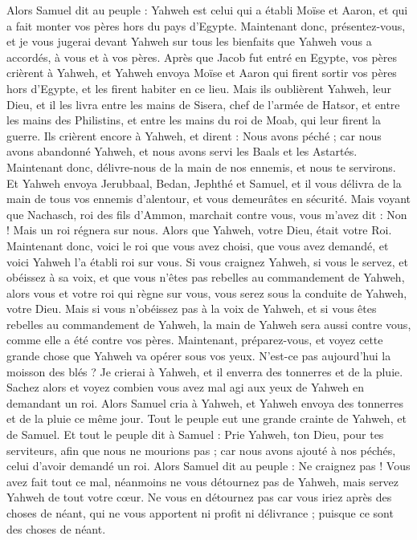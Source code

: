 \begin{multicols}{2}
Alors Samuel dit au peuple : Yahweh est celui qui a établi Moïse et Aaron, et qui a fait monter vos pères hors du pays d'Egypte.
Maintenant donc, présentez-vous, et je vous jugerai devant Yahweh sur tous les bienfaits que Yahweh vous a accordés, à vous et à vos pères.
Après que Jacob fut entré en Egypte, vos pères crièrent à Yahweh, et Yahweh envoya Moïse et Aaron qui firent sortir vos pères hors d'Egypte, et les firent habiter en ce lieu.
Mais ils oublièrent Yahweh, leur Dieu, et il les livra entre les mains de Sisera, chef de l'armée de Hatsor, et entre les mains des Philistins, et entre les mains du roi de Moab, qui leur firent la guerre.
Ils crièrent encore à Yahweh, et dirent : Nous avons péché ; car nous avons abandonné Yahweh, et nous avons servi les Baals et les Astartés. Maintenant donc, délivre-nous de la main de nos ennemis, et nous te servirons.
Et Yahweh envoya Jerubbaal, Bedan, Jephthé et Samuel, et il vous délivra de la main de tous vos ennemis d'alentour, et vous demeurâtes en sécurité.
Mais voyant que Nachasch, roi des fils d’Ammon, marchait contre vous, vous m'avez dit : Non ! Mais un roi régnera sur nous. Alors que Yahweh, votre Dieu, était votre Roi.
Maintenant donc, voici le roi que vous avez choisi, que vous avez demandé, et voici Yahweh l'a établi roi sur vous.
Si vous craignez Yahweh, si vous le servez, et obéissez à sa voix, et que vous n’êtes pas rebelles au commandement de Yahweh, alors vous et votre roi qui règne sur vous, vous serez sous la conduite de Yahweh, votre Dieu.
Mais si vous n'obéissez pas à la voix de Yahweh, et si vous êtes rebelles au commandement de Yahweh, la main de Yahweh sera aussi contre vous, comme elle a été contre vos pères.
Maintenant, préparez-vous, et voyez cette grande chose que Yahweh va opérer sous vos yeux.
N'est-ce pas aujourd'hui la moisson des blés ? Je crierai à Yahweh, et il enverra des tonnerres et de la pluie. Sachez alors et voyez combien vous avez mal agi aux yeux de Yahweh en demandant un roi.
Alors Samuel cria à Yahweh, et Yahweh envoya des tonnerres et de la pluie ce même jour. Tout le peuple eut une grande crainte de Yahweh, et de Samuel.
Et tout le peuple dit à Samuel : Prie Yahweh, ton Dieu, pour tes serviteurs, afin que nous ne mourions pas ; car nous avons ajouté à nos péchés, celui d'avoir demandé un roi.
Alors Samuel dit au peuple : Ne craignez pas ! Vous avez fait tout ce mal, néanmoins ne vous détournez pas de Yahweh, mais servez Yahweh de tout votre cœur.
Ne vous en détournez pas car vous iriez après des choses de néant, qui ne vous apportent ni profit ni délivrance ; puisque ce sont des choses de néant.

\end{multicols}
